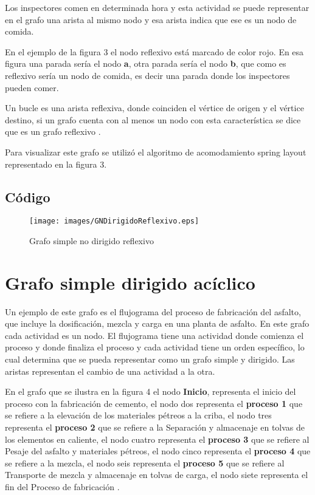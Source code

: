 \documentclass{article}
\begin{document}
Los inspectores comen en determinada hora y esta actividad se puede representar en el grafo una arista al mismo nodo y esa arista indica que ese es un nodo de comida. 

En el ejemplo de la figura 3 el nodo reflexivo está marcado de color rojo. En esa figura una parada sería el nodo \textbf{a}, otra parada sería el nodo \textbf{b}, que como es reflexivo sería un nodo de comida, es decir una parada donde los inspectores pueden comer. 

Un bucle es una arista reflexiva, donde coinciden el vértice de origen y el vértice destino, si un grafo cuenta con al menos un nodo con esta característica se dice que es un grafo reflexivo \cite[pág 6]{schaeffere}. 

Para visualizar este grafo se utilizó el algoritmo de acomodamiento spring layout representado en la figura 3.  


\subsection{Código}



\begin{figure}[H] 
    \centering
        \texttt{[image: images/GNDirigidoReflexivo.eps]}
\caption{Grafo simple no dirigido reflexivo}
\label{fig:seq1}
\end{figure}

\section{Grafo simple dirigido acíclico}

Un ejemplo de este grafo es el flujograma del proceso de fabricación del asfalto, que incluye la dosificación, mezcla y carga en una planta de asfalto. En este grafo cada actividad es un nodo. El flujograma tiene una actividad donde comienza el proceso y donde finaliza el proceso y cada actividad tiene un orden específico, lo cual determina que se pueda representar como un grafo simple y dirigido. Las aristas representan el cambio de una actividad a la otra.  

En el grafo que se ilustra en la figura 4 el nodo \textbf{Inicio}, representa el inicio del proceso con la fabricación de cemento,  el nodo dos representa el \textbf{proceso 1} que se refiere a la elevación de los materiales pétreos a la criba, el nodo tres representa el \textbf{proceso 2} que se refiere a la Separación y almacenaje en tolvas de los elementos en caliente, el nodo cuatro representa el \textbf{proceso 3} que se refiere al Pesaje del asfalto y materiales pétreos, el nodo cinco representa el \textbf{proceso 4} que se refiere a la mezcla, el nodo seis representa el \textbf{proceso 5} que se refiere al Transporte de mezcla y almacenaje en tolvas de carga, el nodo siete representa el fin del Proceso de fabricación  \cite[pág 78]{alfonsolopez}.
\end{document}
